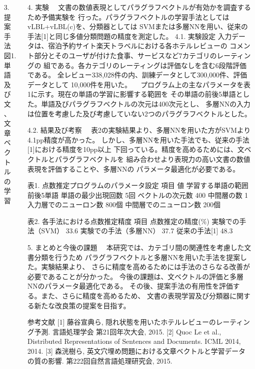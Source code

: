 \documentclass[12pt,unicode]{beamer}
\begin{document}
\begin{frame}{}
\begin{columns}[t]
\begin{column}{0.49\textwidth}
\begin{block}{3. 提案手法}
図1. 単語及び文、文章ベクトルの学習
\end{block}

\end{column}
\begin{column}{0.49\textwidth}

\begin{block}{4. 実験}
　文書の数値表現としてパラグラフベクトルが有効かを調査するため予備実験を
行った。パラグラフベクトルの学習手法としてはvLBL+vLBL(c)を、分類器としては
SVMまたは多層NNを用い、従来の手法[1]と同じ多値分類問題の精度を測定した。
4.1. 実験設定
入力データは、宿泊予約サイト楽天トラベルにおける各ホテルレビューの
コメント部分とそのユーザが付けた食事、サービスなど7カテゴリのレーティングの
組である。各カテゴリのレーティングは評価なしを含む6段階評価である。
全レビュー338,028件の内、訓練データとして300,000件、評価データとして
10,000件を用いた。
　プログラム上の主なパラメータを表1に示す。現在の単語の学習に影響する範囲を
その単語の前後5単語とした。単語及びパラグラフベクトルの次元は400次元とし、
多層NNの入力は位置を考慮した及び考慮していない2つのパラグラフベクトルとした。

4.2. 結果及び考察
　表2の実験結果より、多層NNを用いた方がSVMより4.1pp精度が高かった。
しかし、多層NNを用いた手法でも、従来の手法[1]における精度を10pp以上
下回っている。精度を高めるためには、文ベクトルとパラグラフベクトルを
組み合わせより表現力の高い文書の数値表現を評価することや、多層NNの
パラメータ最適化が必要である。

表1. 点数推定プログラムのパラメータ設定
項目
値
学習する単語の範囲
前後5単語
単語の最少出現回数
5回
ベクトルの次元数
400
中間層の数
1
入力層でのニューロン数
800個
中間層でのニューロン数
200個

表2. 各手法における点数推定精度
項目
点数推定の精度(\%)
実験での手法（SVM）
33.6
実験での手法（多層NN）
37.7
従来の手法[1]
48.3
\end{block}

\begin{block}{5. まとめと今後の課題}
　本研究では、カテゴリ間の関連性を考慮した文書分類を行うため
パラグラフベクトルと多層NNを用いた手法を提案した。実験結果より、
さらに精度を高めるためには手法のさらなる改善が必要であることが分かった。
今後の課題は、文ベクトルの評価と多層NNのパラメータ最適化である。
その後、提案手法の有用性を評価する。また、さらに精度を高めるため、
文書の表現学習及び分類器に関する新たな改良策の提案を目指す。
\end{block}

参考文献
[1] 藤谷宣典ら, 隠れ状態を用いたホテルレビューのレーティング予測.
言語処理学会 第21回年次大会, 2015.
[2] Quoc Le et al., Distributed Representations of Sentences and Documents.
ICML 2014, 2014.
[3] 森洸樹ら, 英文穴埋め問題における文章ベクトルと学習データの質の影響.
第222回自然言語処理研究会, 2015.


\end{column}
\end{columns}
\end{frame}
\end{document}
